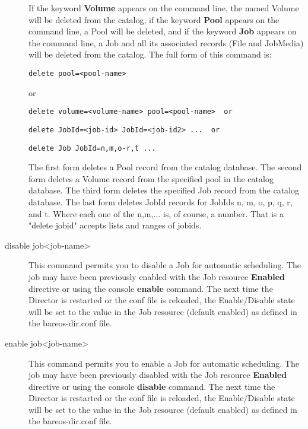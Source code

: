 \begin{description}
   If the keyword {\bf Volume} appears on the command line, the named
   Volume will be deleted from the catalog, if the keyword {\bf Pool}
   appears on the command line, a Pool will be deleted, and if the keyword
   {\bf Job} appears on the command line, a Job and all its associated
   records (File and JobMedia) will be deleted from the catalog.  The full
   form of this command is:

\begin{verbatim}
delete pool=<pool-name>
\end{verbatim}

   or

\begin{verbatim}
delete volume=<volume-name> pool=<pool-name>  or
\end{verbatim}

\begin{verbatim}
delete JobId=<job-id> JobId=<job-id2> ...  or
\end{verbatim}

\begin{verbatim}
delete Job JobId=n,m,o-r,t ...
\end{verbatim}

   The first form deletes a Pool record from the catalog database.  The
   second form deletes a Volume record from the specified pool in the
   catalog database.  The third form deletes the specified Job record from
   the catalog database.  The last form deletes JobId records for JobIds
   n, m, o, p, q, r, and t.  Where each one of the n,m,...  is, of course, a
   number. That is a "delete jobid" accepts lists and ranges of
   jobids.

\item [disable job{\textless}job-name{\textgreater}]
  This command permits you to disable a Job for automatic scheduling.
  The job may have been previously enabled with the Job resource
  {\bf Enabled} directive or using the console {\bf enable} command.
  The next time the Director is restarted or the conf file is reloaded,
  the Enable/Disable state will be set to the value in the Job resource
  (default enabled) as defined in the bareos-dir.conf file.

\item [enable job{\textless}job-name{\textgreater}]
  This command permits you to enable a Job for automatic scheduling.
  The job may have been previously disabled with the Job resource
  {\bf Enabled} directive or using the console {\bf disable} command.
  The next time the Director is restarted or the conf file is reloaded,
  the Enable/Disable state will be set to the value in the Job resource
  (default enabled) as defined in the bareos-dir.conf file.


\end{description}
